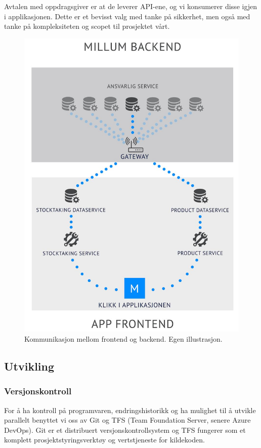 Avtalen med oppdragsgiver er at de leverer API-ene, og vi konsumerer disse igjen i applikasjonen. Dette er et bevisst valg med tanke på sikkerhet, men også med tanke på kompleksiteten og scopet til prosjektet vårt. 

\begin{figure}[H] 
    \centering
    \includegraphics[width=\textwidth]{figures/Tekniske-valg/Arkitektur/kommunikasjon.JPG}
    \caption{Kommunikasjon mellom frontend og backend. Egen illustrasjon.}
\end{figure}

\subsection{\textbf{Utvikling}}
\subsubsection{\textbf{Versjonskontroll}}
For å ha kontroll på programvaren, endringshistorikk og ha mulighet til å utvikle parallelt benyttet vi oss av Git  og TFS (Team Foundation Server, senere Azure DevOps). Git er et distribuert versjonskontrollsystem og TFS fungerer som et komplett prosjektstyringsverktøy og vertstjeneste for kildekoden.

